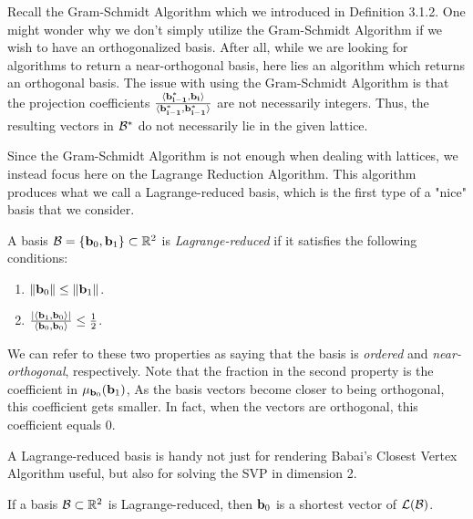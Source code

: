 \documentclass[a4paper,12pt]{article}
\begin{document}

Recall the Gram-Schmidt Algorithm which we introduced in Definition 3.1.2. One might wonder why we don't simply utilize the Gram-Schmidt Algorithm if we wish to have an orthogonalized basis. After all, while we are looking for algorithms to return a near-orthogonal basis, here lies an algorithm which returns an orthogonal basis. The issue with using the Gram-Schmidt Algorithm is that the projection coefficients $\frac{\langle \mathbf{\mathbf{b}_{i-1}^*}, \mathbf{\mathbf{b}_i} \rangle}{\langle \mathbf{\mathbf{b}_{i-1}^*}, \mathbf{\mathbf{b}_{i-1}^*} \rangle}$ are not necessarily integers. Thus, the resulting vectors in $\mathcal{B}^*$ do not necessarily lie in the given lattice. 

Since the Gram-Schmidt Algorithm is not enough when dealing with lattices, we instead focus here on the Lagrange Reduction Algorithm. This algorithm produces what we call a Lagrange-reduced basis, which is the first type of a "nice" basis that we consider. 

\begin{defn}
A basis $\mathcal{B} = \lbrace \mathbf{b}_0, \mathbf{b}_1 \rbrace \subset \mathbb{R}^2$ is \textit{Lagrange-reduced} if it satisfies the following conditions:
    \begin{enumerate}
    \item $\|\mathbf{b}_0\| \leq \|\mathbf{b}_1\|$.
    \item $\frac{| \langle \mathbf{b}_1, \mathbf{b}_0 \rangle |}{\langle \mathbf{b}_0, \mathbf{b}_0 \rangle} \leq \frac{1}{2}$.
    \end{enumerate}
\end{defn}

We can refer to these two properties as saying that the basis is \textit{ordered} and \textit{near-orthogonal}, respectively. Note that the fraction in the second property is the coefficient in $\mu_{\mathbf{b}_0}(\mathbf{b}_1)$, As the basis vectors become closer to being orthogonal, this coefficient gets smaller. In fact, when the vectors are orthogonal, this coefficient equals $0$. 

A Lagrange-reduced basis is handy not just for rendering Babai's Closest Vertex Algorithm useful, but also for solving the SVP in dimension 2.

\begin{thm}
If a basis $\mathcal{B} \subset \mathbb{R}^2$ is Lagrange-reduced, then $\mathbf{b}_0$ is a shortest vector of $\mathcal{L}(\mathcal{B})$.  
\end{thm}
\end{document}
